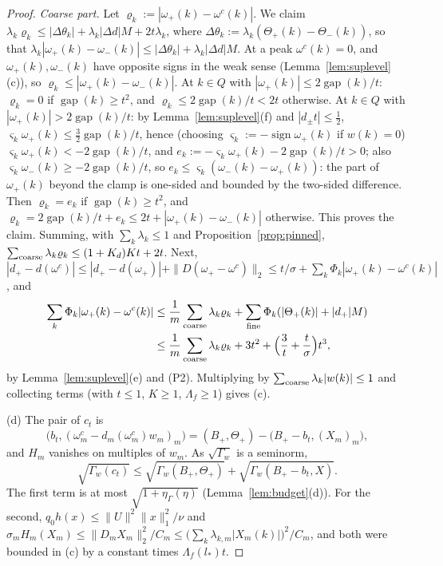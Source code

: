 \documentclass[10pt]{amsart}
\theoremstyle{definition}
\theoremstyle{remark}
\newcommand{\sgn}{\operatorname{sign}}
\newcommand{\gap}{\operatorname{gap}}
\begin{document}
\begin{proof}
\emph{Coarse part.}  Let $\varrho_k:=|\omega_+(k)-\omega^c(k)|$.  We claim
$\lambda_k\varrho_k\le|\Delta\theta_k|+\lambda_k|\Delta d|M+2t\lambda_k$, where
$\Delta\theta_k:=\lambda_k(\Theta_+(k)-\Theta_-(k))$, so that
$\lambda_k|\omega_+(k)-\omega_-(k)|\le|\Delta\theta_k|+\lambda_k|\Delta d|M$.
At a peak $\omega^c(k)=0$, and $\omega_+(k),\omega_-(k)$ have opposite signs
in the weak sense (Lemma~\ref{lem:suplevel}(c)), so $\varrho_k\le|\omega_+(k)-
\omega_-(k)|$.  At $k\in Q$ with $|\omega_+(k)|\le2\gap(k)/t$: $\varrho_k=0$ if
$\gap(k)\ge t^2$, and $\varrho_k\le2\gap(k)/t<2t$ otherwise.  At $k\in Q$ with
$|\omega_+(k)|>2\gap(k)/t$: by Lemma~\ref{lem:suplevel}(f) and $|d_\pm t|\le
\frac12$, $\varsigma_k\omega_+(k)\le\frac32\gap(k)/t$, hence (choosing
$\varsigma_k:=-\sgn\omega_+(k)$ if $w(k)=0$) $\varsigma_k\omega_+(k)<
-2\gap(k)/t$, and $e_k:=-\varsigma_k\omega_+(k)-2\gap(k)/t>0$; also
$\varsigma_k\omega_-(k)\ge-2\gap(k)/t$, so $e_k\le\varsigma_k(\omega_-(k)-
\omega_+(k))$: the part of $\omega_+(k)$ beyond the clamp is one-sided and
bounded by the two-sided difference.  Then $\varrho_k=e_k$ if $\gap(k)\ge t^2$,
and $\varrho_k=2\gap(k)/t+e_k\le2t+|\omega_+(k)-\omega_-(k)|$ otherwise.  This
proves the claim.  Summing, with $\sum_k\lambda_k\le1$ and
Proposition~\ref{prop:pinned}, $\sum_{\rm coarse}\lambda_k\varrho_k\le
(1+K_d)Kt+2t$.  Next, $|d_+-d(\omega^c)|\le|d_+-d(\omega_+)|+\|D(\omega_+-
\omega^c)\|_2\le t/\sigma+\sum_k\Phi_k|\omega_+(k)-\omega^c(k)|$, and
\begin{align*}
 \sum_k\Phi_k|\omega_+(k)-\omega^c(k)|&\le\frac1m\sum_{\rm coarse}
 \lambda_k\varrho_k+\sum_{\rm fine}\Phi_k(|\Theta_+(k)|+|d_+|M)\\
 &\le\frac1m\sum_{\rm coarse}\lambda_k\varrho_k+3t^2+\Big(\frac3t+\frac
 t\sigma\Big)t^3,
\end{align*}
by Lemma~\ref{lem:suplevel}(e) and (P2).  Multiplying by
$\sum_{\rm coarse}\lambda_k|w(k)|\le1$ and collecting terms (with $t\le1$,
$K\ge1$, $\Lambda_f\ge1$) gives (c).

(d) The pair of $c_t$ is
\[
 \big(b_t,(\omega^c_m-d_m(\omega^c_m)w_m)_m\big)=(B_+,\Theta_+)-\big(B_+-b_t,
 (X_m)_m\big),
\]
and $H_m$ vanishes on multiples of $w_m$.  As $\sqrt{\Gamma_w}$ is a
seminorm,
\[
 \sqrt{\Gamma_w(c_t)}\le\sqrt{\Gamma_w(B_+,\Theta_+)}+\sqrt{\Gamma_w(B_+-
 b_t,X)}.
\]  The first term is at most
$\sqrt{1+\eta_\Gamma(\eta)}$ (Lemma~\ref{lem:budget}(d)).  For the second,
$q_0h(x)\le\|U\|^2\|x\|_1^2/\nu$ and
$\sigma_mH_m(X_m)\le\|D_mX_m\|_2^2/C_m\le\big(\sum_k\lambda_{k,m}|X_m(k)|
\big)^2/C_m$, and both were bounded in (c) by a
constant times $\Lambda_f(l_*)t$.
\end{proof}
\end{document}
